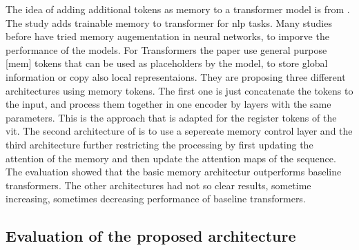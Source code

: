 \documentclass[conference]{IEEEtran}
\begin{document}

  The idea of adding additional tokens as memory to a transformer model is from \cite{memorytransformer}. The study adds trainable memory to transformer for \ac{nlp} tasks. Many studies before have tried memory augementation in neural networks, to imporve the performance of the models. For Transformers the paper use general purpose [mem] tokens that can be used as placeholders by the model, to store global information or copy also local representaions. They are proposing three different architectures using memory tokens. The first one is just concatenate the tokens to the input, and process them together in one encoder by layers with the same parameters. This is the approach that is adapted for the register tokens of the \ac{vit}. The second architecture of \cite{memorytransformer} is to use a sepereate memory control layer and the third architecture further restricting the processing by first updating the attention of the memory and then update the attention maps of the sequence. The evaluation showed that the basic memory architectur outperforms baseline transformers. The other architectures had not so clear results, sometime increasing, sometimes decreasing performance of baseline transformers.

  \subsection{Evaluation of the proposed architecture}
\end{document}
